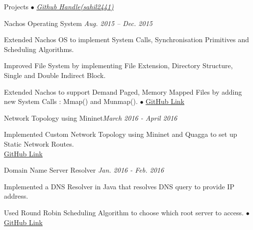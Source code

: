 \documentclass{resume} %
\begin{document}
\begin{rSection}{Projects {$\bullet$} \emph{\href{http://www.github.com/sahil2441}{\footnotesize Github Handle(sahil2441)}}}



\begin{rSubsection}{Nachos Operating System} {\emph {Aug. 2015 -- Dec. 2015}}{}{}
\item Extended Nachos OS to implement System Calls, Synchronisation Primitives and Scheduling Algorithms.
\item Improved File System by implementing File Extension, Directory Structure, Single and Double Indirect Block.
\item Extended Nachos to support Demand Paged, Memory Mapped Files by adding new System Calls : Mmap() and Munmap().
{\tiny$\bullet$}
\href{https://github.com/sahil2441/Nachos-Operating-System}{GitHub Link}
\end{rSubsection}


\begin{rSubsection}{Network Topology using Mininet}{\emph{March 2016 - April 2016}}{}{}
\item Implemented Custom Network Topology using Mininet and Quagga to set up Static Network Routes. \\
\href{https://github.com/sahil2441/FCN-Projects}{GitHub Link}
\end{rSubsection}


\begin{rSubsection}{Domain Name Server Resolver} {\emph {Jan. 2016 - Feb. 2016}}{}{}
\item Implemented a DNS Resolver in Java that resolves DNS query to provide IP address.
\item Used Round Robin Scheduling Algorithm to choose which root server to access. {\tiny$\bullet$}     
\href{https://github.com/sahil2441/FCN-Projects}{GitHub Link}
\end{rSubsection}


\end{rSection}
\end{document}
